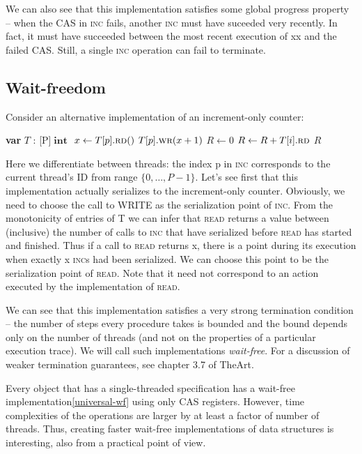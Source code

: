 \documentclass[a4paper,11pt]{article}
\def\int{\ensuremath{\operatorname{\textbf{int}}}}
\newcommand{\fn}[1]{\textsc{#1}}
\newcommand{\var}[2]{\textbf{var }#1 : #2}
\newcommand{\arrayspec}[1]{\text{array}[#1]\text{ of }}
\begin{document}
We can also see that this implementation satisfies some global progress property -- when the CAS in \fn{inc} fails,
another \fn{inc} must have suceeded very recently. In fact, it must have succeeded between the most recent execution
of xx and the failed CAS. Still, a single \fn{inc} operation can fail to terminate.

\subsection{Wait-freedom}

Consider an alternative implementation of an increment-only counter:

\begin{algorithmic}[1]
	\State\var{$T$}{\arrayspec{P}$\int$} \Comment{T is an array of $P$ CAS objects of type \int}
	\State $x \gets T[p].\fn{rd}()$
	\State $T[p].\fn{wr}(x + 1)$
\EndFunction
{}
	\State $R \gets 0$
	\State $R \gets R + T[i].\fn{rd}$
	\EndFor
	\State\Return $R$
\EndFunction
\end{algorithmic}

Here we differentiate between threads: the index p in \fn{inc} corresponds to the current thread's ID from range
$\{0, \ldots, P-1\}$. Let's see first that this implementation actually serializes to the increment-only counter.
Obviously, we need to choose the call to WRITE as the serialization point of \fn{inc}. From the monotonicity
of entries of T we can infer that \fn{read} returns a value between (inclusive) the number of calls to \fn{inc} that have
serialized before \fn{read} has started and finished. Thus if a call to \fn{read} returns x, there is a point during its
execution when exactly x \fn{inc}s had been serialized. We can choose this point to be the serialization point of
\fn{read}. Note that it need not correspond to an action executed by the implementation of \fn{read}.

We can see that this implementation satisfies a very strong termination condition -- the number of steps every
procedure takes is bounded and the bound depends only on the number of threads (and not on the properties of
a particular execution trace). We will call such implementations \emph{wait-free}. For a discussion of weaker
termination guarantees, see chapter 3.7 of TheArt.

Every object that has a single-threaded specification has a wait-free implementation\ref{universal-wf} using
only CAS registers.
However, time complexities of the operations are larger by at least a factor of number of threads. 
Thus, creating faster wait-free implementations of data structures is interesting, also from a practical
point of view.
\end{document}
